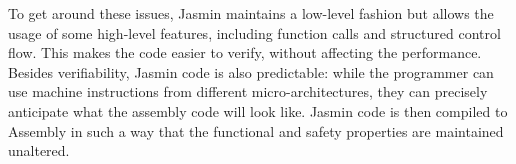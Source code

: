 \documentclass[12pt,a4paper]{book}
\theoremstyle{definition}
\begin{document}
	To get around these issues, Jasmin maintains a low-level fashion but allows the usage of some high-level features, including function calls and structured control flow. This makes the code easier to verify, without affecting the performance. Besides verifiability, Jasmin code is also predictable: while the programmer can use machine instructions from different micro-architectures, they can precisely anticipate what the assembly code will look like. Jasmin code is then compiled to Assembly in such a way that the functional and safety properties are maintained unaltered. 
	
	{}
	
	
\end{document}
